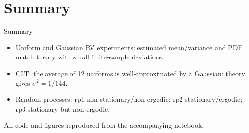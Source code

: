 \documentclass[aspectratio=169,10pt]{beamer}
\begin{document}
\section*{Summary}

\begin{frame}{Summary}
\begin{itemize}
	\item Uniform and Gaussian RV experiments: estimated mean/variance and PDF match theory with small finite-sample deviations.
	\item CLT: the average of 12 uniforms is well-approximated by a Gaussian; theory gives $\sigma^2=1/144$.
	\item Random processes: rp1 non-stationary/non-ergodic; rp2 stationary/ergodic; rp3 stationary but non-ergodic.
\end{itemize}
\vspace{0.5em}
\small
All code and figures reproduced from the accompanying notebook.
\end{frame}
\end{document}
